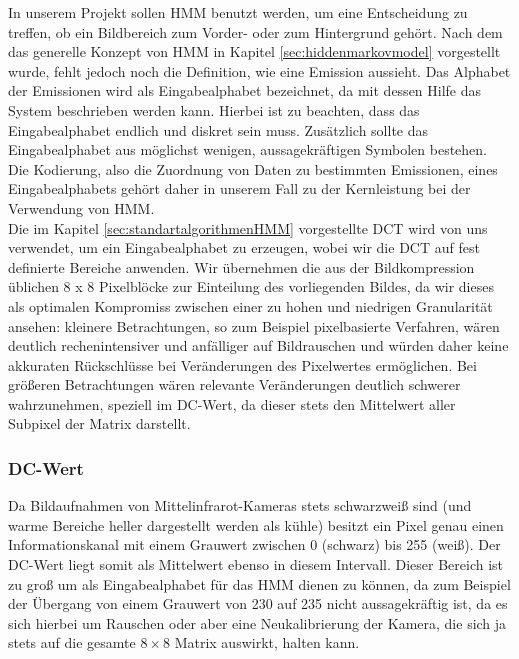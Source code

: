 In unserem Projekt sollen HMM benutzt werden, um eine Entscheidung zu treffen, ob ein Bildbereich zum Vorder- oder zum Hintergrund gehört.
Nach dem das generelle Konzept von HMM in Kapitel \ref{sec:hiddenmarkovmodel} vorgestellt wurde, fehlt jedoch noch die Definition, wie eine Emission aussieht.
Das Alphabet der Emissionen wird als Eingabealphabet bezeichnet, da mit dessen Hilfe das System beschrieben werden kann.
Hierbei ist zu beachten, dass das Eingabealphabet endlich und diskret sein muss.
Zusätzlich sollte das Eingabealphabet aus möglichst wenigen, aussagekräftigen Symbolen bestehen.
Die Kodierung, also die Zuordnung von Daten zu bestimmten Emissionen,  eines Eingabealphabets gehört daher in unserem Fall zu der Kernleistung bei der Verwendung von HMM.\\
Die im Kapitel \ref{sec:standartalgorithmenHMM} vorgestellte DCT wird von uns verwendet, um ein Eingabealphabet zu erzeugen, wobei wir die DCT auf fest definierte Bereiche anwenden.
Wir übernehmen die aus der Bildkompression üblichen 8 x 8 Pixelblöcke zur Einteilung des vorliegenden Bildes, da wir dieses als optimalen Kompromiss zwischen einer zu hohen und niedrigen Granularität ansehen: kleinere Betrachtungen, so zum Beispiel pixelbasierte Verfahren, wären deutlich rechenintensiver und anfälliger auf Bildrauschen und würden daher keine akkuraten Rückschlüsse bei Veränderungen des Pixelwertes ermöglichen.
Bei größeren Betrachtungen wären relevante Veränderungen deutlich schwerer wahrzunehmen, speziell im DC-Wert, da dieser stets den Mittelwert aller Subpixel der Matrix darstellt.


\subsubsection{DC-Wert}

Da Bildaufnahmen von Mittelinfrarot-Kameras stets schwarzweiß sind (und warme Bereiche heller dargestellt werden als kühle) besitzt ein Pixel genau einen Informationskanal mit einem Grauwert zwischen 0 (schwarz) bis 255 (weiß).
Der DC-Wert liegt somit als Mittelwert ebenso in diesem Intervall.
Dieser Bereich ist zu groß um als Eingabealphabet für das HMM dienen zu können, da zum Beispiel der Übergang von einem Grauwert von 230 auf 235 nicht aussagekräftig ist, da es sich hierbei um Rauschen oder aber eine Neukalibrierung der Kamera, die sich ja stets auf die gesamte $8 \times 8$ Matrix auswirkt, halten kann.\\

